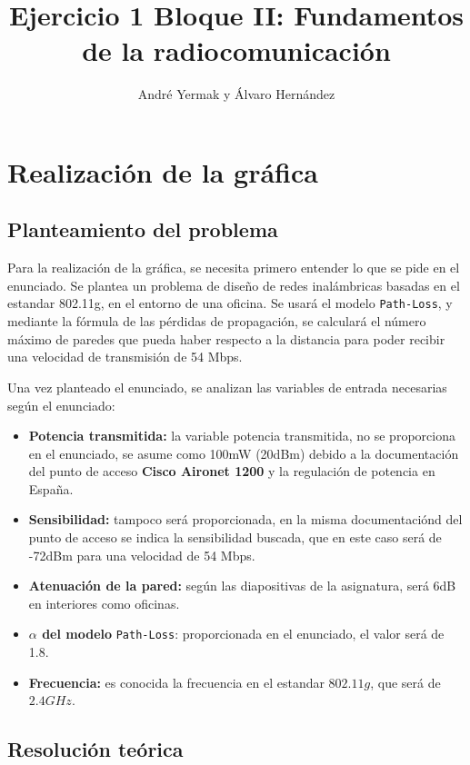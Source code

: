 \documentclass{article}
\title{Ejercicio 1 Bloque II: Fundamentos de la radiocomunicación}
\author{André Yermak y Álvaro Hernández}
\begin{document}
\maketitle


\section{Realización de la gráfica}

\subsection{Planteamiento del problema}

Para la realización de la gráfica, se necesita primero entender lo que se pide en el enunciado. Se plantea un problema de diseño de redes inalámbricas basadas en el estandar 802.11g, en el entorno de una oficina. 
Se usará el modelo \verb|Path-Loss|, y mediante la fórmula de las pérdidas de propagación, se calculará el número máximo de paredes que pueda haber respecto a la distancia para poder recibir una velocidad de transmisión de 54 Mbps. 

Una vez planteado el enunciado, se analizan las variables de entrada necesarias según el enunciado:

\begin{itemize}
      \item \textbf{Potencia transmitida:} la variable potencia transmitida, no se proporciona en el enunciado, se asume como 100mW (20dBm) debido a la documentación del punto de acceso \textbf{Cisco Aironet 1200} y la regulación de potencia en España. 
      \item \textbf{Sensibilidad:} tampoco será proporcionada, en la misma documentaciónd del punto de acceso se indica la sensibilidad buscada, que en este caso será de -72dBm para una velocidad de 54 Mbps.
      \item \textbf{Atenuación de la pared:} según las diapositivas de la asignatura, será 6dB en interiores como oficinas.
      \item \textbf{$\alpha$ del modelo} \verb|Path-Loss|: proporcionada en el enunciado, el valor será de 1.8.
      \item  \textbf{Frecuencia:} es conocida la frecuencia en el estandar $802.11g$, que será de $2.4GHz$.
\end{itemize}
\subsection{Resolución teórica}
\end{document}
